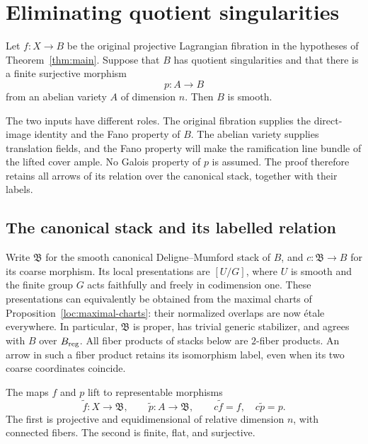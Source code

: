 \section{Eliminating quotient singularities}\label{quot:section}
\label{sec:quotient}

\begin{proposition}
\label{quot:smooth-base}
Let \(f:X\to B\) be the original projective Lagrangian fibration in
the hypotheses of Theorem~\ref{thm:main}.  Suppose that \(B\) has
quotient singularities and that there is a finite surjective morphism
\[
                         p:A\longrightarrow B
\]
from an abelian variety \(A\) of dimension \(n\).  Then \(B\) is smooth.
\end{proposition}

The two inputs have different roles.  The original fibration supplies
the direct-image identity and the Fano property of \(B\).  The abelian
variety supplies translation fields, and the Fano property will make
the ramification line bundle of the lifted cover ample.  No Galois
property of \(p\) is assumed.  The proof therefore retains all arrows
of its relation over the canonical stack, together with their labels.

\subsection{The canonical stack and its labelled relation}
\label{quot:stack-field}

Write \(\mathfrak B\) for the smooth canonical Deligne--Mumford stack
of \(B\), and \(c:\mathfrak B\to B\) for its coarse morphism.
Its local presentations are \([U/G]\), where \(U\) is smooth and the
finite group \(G\) acts faithfully and freely in codimension one.
These presentations can equivalently be obtained from the maximal
charts of Proposition~\ref{loc:maximal-charts}: their normalized overlaps
are now étale everywhere.  In particular, \(\mathfrak B\) is proper,
has trivial generic stabilizer, and agrees with \(B\) over \(B_{\rm reg}\).
All fiber products of stacks below are \(2\)-fiber products.  An arrow in
such a fiber product retains its isomorphism label, even when its two
coarse coordinates coincide.

\begin{lemma}\label{quot:lifts}
The maps \(f\) and \(p\) lift to representable morphisms
\[
          \widetilde f:X\longrightarrow\mathfrak B,
       \qquad \widetilde p:A\longrightarrow\mathfrak B,
       \qquad c\widetilde f=f,\quad c\widetilde p=p.
\]
The first is projective and equidimensional of relative dimension
\(n\), with connected fibers.  The second is finite, flat, and surjective.
\end{lemma}

